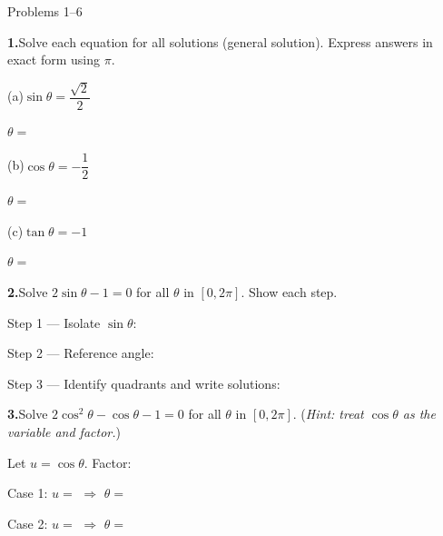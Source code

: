 \documentclass[10pt]{article}
\begin{document}
\namedateperiod

\vspace{0.10in}

\begin{notesbox}{Problems 1--6}

\textbf{1.}\quad Solve each equation for all solutions (general solution).
Express answers in exact form using $\pi$.

\vspace{4pt}
(a)\quad $\sin\theta = \dfrac{\sqrt{2}}{2}$

\vspace{0.12in}
$\theta = $ \writeline

\vspace{8pt}
(b)\quad $\cos\theta = -\dfrac{1}{2}$

\vspace{0.12in}
$\theta = $ \writeline

\vspace{8pt}
(c)\quad $\tan\theta = -1$

\vspace{0.12in}
$\theta = $ \writeline

\vspace{0.14in}
\textbf{2.}\quad Solve $2\sin\theta - 1 = 0$ for all $\theta$ in $[0, 2\pi]$.
Show each step.

\vspace{4pt}
Step 1 --- Isolate $\sin\theta$: \writeline

\vspace{4pt}
Step 2 --- Reference angle: \writeline

\vspace{4pt}
Step 3 --- Identify quadrants and write solutions:

\vspace{0.14in}
\textbf{3.}\quad Solve $2\cos^2\theta - \cos\theta - 1 = 0$ for all $\theta$
in $[0, 2\pi]$.  (\textit{Hint: treat $\cos\theta$ as the variable and factor.})

\vspace{4pt}
Let $u = \cos\theta$. Factor: \writeline

\vspace{4pt}
Case 1: $u = $ \underline{\hspace{1cm}} $\Rightarrow$ $\theta = $ \writeline

\vspace{4pt}
Case 2: $u = $ \underline{\hspace{1cm}} $\Rightarrow$ $\theta = $ \writeline


\end{notesbox}
\end{document}
